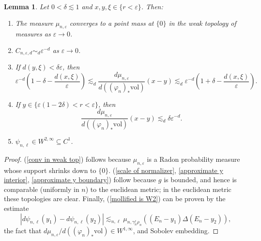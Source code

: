 \documentclass[reqno,12pt,letterpaper]{amsart}
\newcommand{\vol}{\mathrm{vol}}
\newtheorem{lemma}[theorem]{Lemma}
\theoremstyle{definition}
\numberwithin{equation}{section}
\begin{document}
\begin{lemma}\label{mollify props}
Let $0 < \delta \lesssim 1$ and $x, y, \xi \in \{r < \varepsilon\}$. Then:
\begin{enumerate}
\item \label{conv in weak top} The measure $\mu_{n, \varepsilon}$ converges to a point mass at $\{0\}$ in the weak topology of measures as $\varepsilon \to 0$.
\item \label{scale of normalizer} $C_{n, \varepsilon, d} \sim_d \varepsilon^{-d}$ as $\varepsilon \to 0$.
\item \label{approximate y interior} If $d(y, \xi) < \delta\varepsilon$, then
$$\varepsilon^{-d}\left(1 - \delta - \frac{d(x, \xi)}{\varepsilon}\right) \lesssim_d \frac{d\mu_{n, \varepsilon}}{d((\varphi_n)_* \vol)}(x - y) \lesssim_d \varepsilon^{-d}\left(1 + \delta - \frac{d(x, \xi)}{\varepsilon}\right).$$
\item \label{approximate y boundary} If $y \in \{\varepsilon(1 - 2\delta) < r < \varepsilon\}$, then
$$\frac{d\mu_{n, \varepsilon}}{d((\varphi_n)_*\vol)}(x - y) \lesssim_d \delta \varepsilon^{-d}.$$
\item \label{mollified is W2} $\psi_{n, \ell} \in W^{2, \infty} \subseteq C^1$.
\end{enumerate}
\end{lemma}
\begin{proof}
(\ref{conv in weak top}) follows because $\mu_{n, \varepsilon}$ is a Radon probability measure whose support shrinks down to $\{0\}$.
(\ref{scale of normalizer}, \ref{approximate y interior}, \ref{approximate y boundary}) follow because $g$ is bounded, and hence is comparable (uniformly in $n$) to the euclidean metric; in the euclidean metric these topologies are clear.
Finally, (\ref{mollified is W2}) can be proven by the estimate
$$|d\psi_{n, \ell}(y_1) - d\psi_{n, \ell}(y_2)| \lesssim_{n, \ell} \mu_{n, \gamma_n^\ell \rho_n}((E_n - y_1) \Delta (E_n - y_2)),$$
the fact that $d\mu_{n, \varepsilon}/d((\varphi_n)_*\vol) \in W^{1, \infty}$, and Sobolev embedding.
\end{proof}
\end{document}
